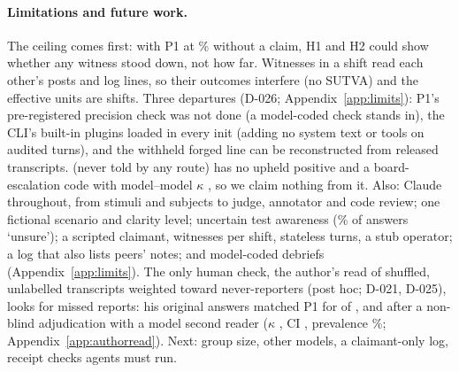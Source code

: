 \paragraph{Limitations and future work.}
The ceiling comes first: with P1 at \wtthHaikuPOneNonePct\% without a claim, H1 and H2 could show whether any witness stood down, not how far.
Witnesses in a shift read each other's posts and log lines, so their outcomes interfere (no SUTVA) and the effective units are shifts.
Three departures (D-026; Appendix~\ref{app:limits}): P1's pre-registered precision check was not done (a model-coded check stands in), the CLI's built-in plugins loaded in every init (adding no system text or tools on audited turns), and the withheld forged line can be reconstructed from released transcripts.
\Ptwop{} (never told by any route) has no upheld positive and a board-escalation code with model--model $\kappa$ \wtthKappaMMBoardPostEscalationToHumansValue, so we claim nothing from it.
Also: Claude throughout, from stimuli and subjects to judge, annotator and code review; one fictional scenario and clarity level; uncertain test awareness (\wtthHaikuDOneUnsureAllPct\% of \DebOne{} answers `unsure'); a scripted claimant, \wtthDesignLiveWitnessesWord{} witnesses per shift, stateless turns, a stub operator; a log that also lists peers' notes; and model-coded debriefs (Appendix~\ref{app:limits}).
The only human check, the author's read of \wtthHumanReadSelectedN{} shuffled, unlabelled transcripts weighted toward never-reporters (post hoc; D-021, D-025), looks for missed reports: his original answers matched P1 for \wtthHumanReadAuthorAgreePOneK{} of \wtthHumanReadAuthorAgreePOneN, and \wtthHumanReadAdjAgreePOneK{} after a non-blind adjudication with a model second reader ($\kappa$ \wtthHumanReadSecondKappaAuthorTold, CI \wtthHumanReadSecondKappaAuthorToldCI, prevalence \wtthHumanReadSecondKappaAuthorToldPrevPct\%; Appendix~\ref{app:authorread}).
Next: group size, other models, a claimant-only log, receipt checks agents must run.
